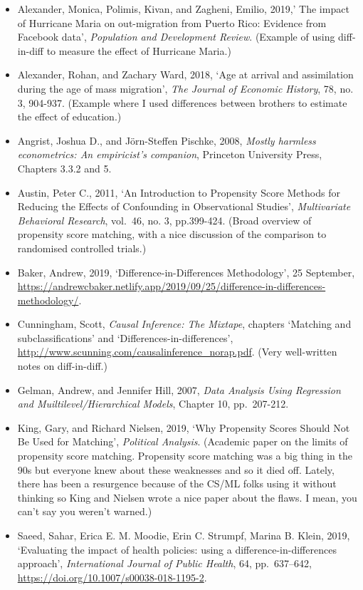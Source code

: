 \documentclass[
]{book}
\providecommand{\tightlist}{%
  \setlength{\itemsep}{0pt}\setlength{\parskip}{0pt}}
\begin{document}
\begin{itemize}
\tightlist
\item
  Alexander, Monica, Polimis, Kivan, and Zagheni, Emilio, 2019,' The impact of Hurricane Maria on out-migration from Puerto Rico: Evidence from Facebook data', \emph{Population and Development Review}. (Example of using diff-in-diff to measure the effect of Hurricane Maria.)
\item
  Alexander, Rohan, and Zachary Ward, 2018, `Age at arrival and assimilation during the age of mass migration', \emph{The Journal of Economic History}, 78, no. 3, 904-937. (Example where I used differences between brothers to estimate the effect of education.)
\item
  Angrist, Joshua D., and Jörn-Steffen Pischke, 2008, \emph{Mostly harmless econometrics: An empiricist's companion}, Princeton University Press, Chapters 3.3.2 and 5.
\item
  Austin, Peter C., 2011, `An Introduction to Propensity Score Methods for Reducing the Effects of Confounding in Observational Studies', \emph{Multivariate Behavioral Research}, vol.~46, no. 3, pp.399-424. (Broad overview of propensity score matching, with a nice discussion of the comparison to randomised controlled trials.)
\item
  Baker, Andrew, 2019, `Difference-in-Differences Methodology', 25 September, \url{https://andrewcbaker.netlify.app/2019/09/25/difference-in-differences-methodology/}.
\item
  Cunningham, Scott, \emph{Causal Inference: The Mixtape}, chapters `Matching and subclassifications' and `Differences-in-differences', \url{http://www.scunning.com/causalinference_norap.pdf}. (Very well-written notes on diff-in-diff.)
\item
  Gelman, Andrew, and Jennifer Hill, 2007, \emph{Data Analysis Using Regression and Muiltilevel/Hierarchical Models}, Chapter 10, pp.~207-212.
\item
  King, Gary, and Richard Nielsen, 2019, `Why Propensity Scores Should Not Be Used for Matching', \emph{Political Analysis}. (Academic paper on the limits of propensity score matching. Propensity score matching was a big thing in the 90s but everyone knew about these weaknesses and so it died off. Lately, there has been a resurgence because of the CS/ML folks using it without thinking so King and Nielsen wrote a nice paper about the flaws. I mean, you can't say you weren't warned.)
\item
  Saeed, Sahar, Erica E. M. Moodie, Erin C. Strumpf, Marina B. Klein, 2019, `Evaluating the impact of health policies: using a difference-in-differences approach', \emph{International Journal of Public Health}, 64, pp.~637--642, \url{https://doi.org/10.1007/s00038-018-1195-2}.

\end{itemize}
\end{document}
